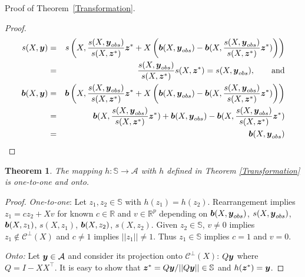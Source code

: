 \documentclass[ba]{imsart}
\newcommand{\by}{\mbox{\boldmath $y$}}
\newcommand{\bz}{\mbox{\boldmath $z$}}
\newcommand{\bb}{\mbox{\boldmath $b$}}
\newtheorem{theorem}{Theorem}[section]
\begin{document}
Proof of Theorem~\ref{Transformation}.  
\begin{proof} 
\begin{eqnarray}
 s(X,\by) & = & s\left(X,\frac{s(X,\by_{obs})}{s(X,\bz^*)}\bz^* + X\left(\bb(X,\by_{obs}) - \bb(X,\frac{s(X,\by_{obs})}{s(X,\bz^*)}\bz^*)\right)\right) \\
& = & \frac{s(X,\by_{obs})}{s(X,\bz^*)} s(X, \bz^*)= s(X,\by_{obs}) , \qquad \mbox{and} \\
 \bb(X,\by) & = & \bb\left(X,\frac{s(X,\by_{obs})}{s(X,\bz^*)}\bz^* + X\left(\bb(X,\by_{obs}) - \bb(X,\frac{s(X,\by_{obs})}{s(X,\bz^*)}\bz^*)\right)\right) \\
 & = & \bb(X,\frac{s(X,\by_{obs})}{s(X,\bz^*)}\bz^*) + \bb(X,\by_{obs}) - \bb(X,\frac{s(X,\by_{obs})}{s(X,\bz^*)}\bz^*) \\ &=& \bb(X,\by_{obs})
\end{eqnarray}
\end{proof}

\noindent
\begin{theorem}
\label{1to1onto}
The mapping $h:  \mathbb{S} \rightarrow \mathcal{A}$ with $h$ defined in Theorem \ref{Transformation} is one-to-one and onto. 
\end{theorem}
\begin{proof} 
\noindent 
\textit{One-to-one}: Let $z_{1}, z_{2} \in \mathbb{S}$ with $h(z_{1}) = h(z_{2})$. Rearrangement implies $z_{1} = cz_{2} + Xv$ for known $c\in \mathbb{R}$ and $v\in \mathbb{R}^{p}$ depending on $\bb(X,\by_{obs})$, $s(X,\by_{obs})$, $\bb(X,z_{1})$, $s(X,z_{1})$, $\bb(X,z_{2})$, $s(X,z_{2})$. Given $z_{2}\in \mathbb{S}$, $v\neq 0$ implies $z_{1}\notin \mathcal{C}^{\perp}(X)$ and $c\neq 1$ implies $||z_{1}|| \neq 1$. Thus $z_{1} \in \mathbb{S}$ implies $c=1$ and $v =0$. 

\noindent \textit{Onto:} Let $\by \in \mathcal{A}$ and consider its projection onto $\mathcal{C}^{\perp}(X)$: $Q\by$ where $Q = I - XX^{\top}$. It is easy to show that $\bz^{*} = Q\by/||Q\by|| \in \mathbb{S}$ and $h(\bz^{*}) = \by$.
\end{proof}
\end{document}
